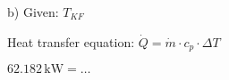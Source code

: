 b) Given: \( T_{KF} \)  

Heat transfer equation:  
\( \dot{Q} = \dot{m} \cdot c_p \cdot \Delta T \)  

\( 62.182 \, \text{kW} = \ldots \)